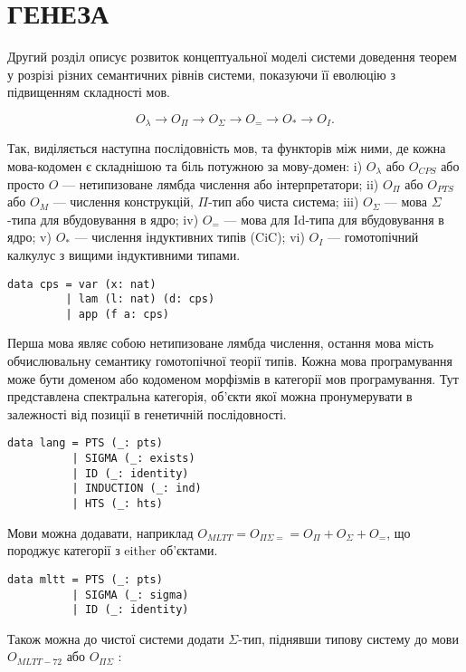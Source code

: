 
\chapter{ГЕНЕЗА}

Другий розділ описує розвиток концептуальної моделі системи доведення теорем
у розрізі різних семантичних рівнів системи, показуючи її еволюцію з
підвищенням складності мов.

$$
O_\lambda \rightarrow O_\Pi \rightarrow O_\Sigma \rightarrow O_{=} \rightarrow O_{*} \rightarrow O_{I}.
$$

Так, виділяється наступна послідовність мов, та функторів між ними,
де кожна мова-кодомен є складнішою та біль потужною за мову-домен:
i) $O_\lambda$ або $O_{CPS}$ або просто $O$ --- нетипизоване лямбда числення або інтерпретатори;
ii) $O_\Pi$ або $O_{PTS}$ або $O_M$ --- числення конструкцій, $\Pi$-тип або чиста система;
iii) $O_\Sigma$ --- мова $\Sigma$-типа для вбудовування в ядро;
iv) $O_{=}$ --- мова для Id-типа для вбудовування в ядро;
v) $O_{*}$ --- числення індуктивних типів (CiC);
vi) $O_{I}$ --- гомотопічний калкулус з вищими індуктивними типами.

\begin{lstlisting}
data cps = var (x: nat)
         | lam (l: nat) (d: cps)
         | app (f a: cps)
\end{lstlisting}

Перша мова являє собою нетипизоване лямбда числення, остання мова
мість обчислювальну семантику гомотопічної теорії типів.
Кожна мова програмування може бути доменом або кодоменом
морфізмів в категорії мов програмування. Тут представлена спектральна категорія,
об'єкти якої можна пронумерувати в залежності від позиції в генетичній послідовності.

\begin{lstlisting}
data lang = PTS (_: pts)
          | SIGMA (_: exists)
          | ID (_: identity)
          | INDUCTION (_: ind)
          | HTS (_: hts)
\end{lstlisting}

Мови можна додавати, наприклад $O_{MLTT} = O_{\Pi\Sigma=} = O_\Pi + O_\Sigma + O_=$,
що породжує категорії з either об'єктами.

\begin{lstlisting}
data mltt = PTS (_: pts)
          | SIGMA (_: sigma)
          | ID (_: identity)
\end{lstlisting}

Також можна до чистої системи додати $\Sigma$-тип,
піднявши типову систему до мови $O_{MLTT-72}$ або $O_{\Pi\Sigma}$ :

